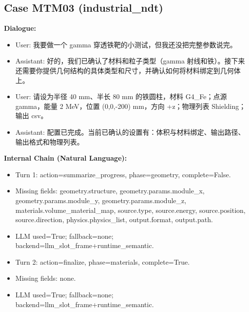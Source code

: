 \documentclass[11pt]{ctexart}
\begin{document}
\subsection{Case MTM03 (industrial\_ndt)}
\textbf{Dialogue:}
\begin{itemize}
\item User: 我要做一个 gamma 穿透铁靶的小测试，但我还没把完整参数说完。
\item Assistant: 好的，我们已确认了材料和粒子类型（gamma 射线和铁）。接下来还需要你提供几何结构的具体类型和尺寸，并确认如何将材料绑定到几何体上。
\item User: 请设为半径 40 mm、半长 80 mm 的铁圆柱，材料 G4\_Fe；点源 gamma，能量 2 MeV，位置 (0,0,-200) mm，方向 +z；物理列表 Shielding；输出 csv。
\item Assistant: 配置已完成。当前已确认的设置有：体积与材料绑定、输出路径、输出格式和物理列表。
\end{itemize}
\textbf{Internal Chain (Natural Language):}
\begin{itemize}
\item Turn 1: action=summarize\_progress, phase=geometry, complete=False.
\item Missing fields: geometry.structure, geometry.params.module\_x, geometry.params.module\_y, geometry.params.module\_z, materials.volume\_material\_map, source.type, source.energy, source.position, source.direction, physics.physics\_list, output.format, output.path.
\item LLM used=True; fallback=none; backend=llm\_slot\_frame+runtime\_semantic.
\item Turn 2: action=finalize, phase=materials, complete=True.
\item Missing fields: none.
\item LLM used=True; fallback=none; backend=llm\_slot\_frame+runtime\_semantic.
\end{itemize}
\end{document}
